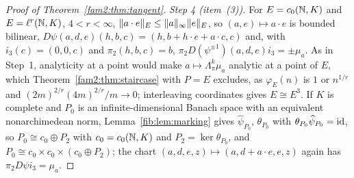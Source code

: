 \begin{proof}[Proof of Theorem~\ref{fam2:thm:tangent}]
\emph{Step 4 (item~(3)).} For $E=c_0(\mathbb N,K)$ and $E=\ell^r(\mathbb N,K)$, $4<r<\infty$, $\lVert a\cdot e\rVert_E\le\lVert a\rVert_\infty\lVert e\rVert_E$,
so $(a,e)\mapsto a\cdot e$ is bounded bilinear, $D\psi(a,d,e)(h,b,c)=(h,b+h\cdot e+a\cdot c,c)$ and, with $i_3(c)=(0,0,c)$
and $\pi_2(h,b,c)=b$, $\pi_2D(\psi^{\pm1})(a,d,e)i_3=\pm\mu_a$. As in Step~1, analyticity at a point would make
$a\mapsto\Lambda^k_\pi\mu_a$ analytic at a point of $E$, which Theorem~\ref{fam2:thm:staircase} with $P=E$ excludes, as
$\varphi_E(n)$ is $1$ or $n^{1/r}$ and $(2m)^{2/r}(4m)^{2/r}/m\to0$; interleaving coordinates gives $E\cong E^3$. If $K$ is
complete and $P_0$ is an infinite-dimensional Banach space with an equivalent nonarchimedean norm, Lemma~\ref{fib:lem:marking}
gives $\widehat\psi_{P_0}$, $\theta_{P_0}$ with $\theta_{P_0}\widehat\psi_{P_0}=\mathrm{id}$, so $P_0\cong c_0\oplus P_2$ with
$c_0=c_0(\mathbb N,K)$ and $P_2=\ker\theta_{P_0}$, and $P_0\cong c_0\times c_0\times(c_0\oplus P_2)$; the chart
$(a,d,e,z)\mapsto(a,d+a\cdot e,e,z)$ again has $\pi_2D\psi i_3=\mu_a$.
\end{proof}

